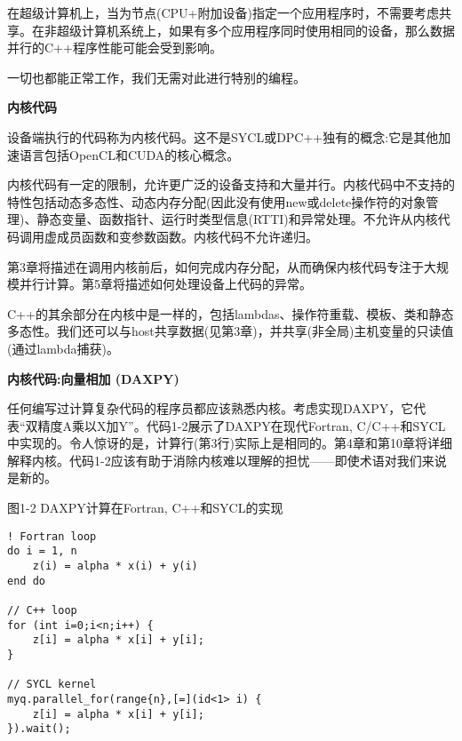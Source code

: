 在超级计算机上，当为节点(CPU+附加设备)指定一个应用程序时，不需要考虑共享。在非超级计算机系统上，如果有多个应用程序同时使用相同的设备，那么数据并行的C++程序性能可能会受到影响。\par

一切也都能正常工作，我们无需对此进行特别的编程。\par

\hspace*{\fill} \par %
\textbf{内核代码}

设备端执行的代码称为内核代码。这不是SYCL或DPC++独有的概念:它是其他加速语言包括OpenCL和CUDA的核心概念。\par

内核代码有一定的限制，允许更广泛的设备支持和大量并行。内核代码中不支持的特性包括动态多态性、动态内存分配(因此没有使用new或delete操作符的对象管理)、静态变量、函数指针、运行时类型信息(RTTI)和异常处理。不允许从内核代码调用虚成员函数和变参数函数。内核代码不允许递归。\par

第3章将描述在调用内核前后，如何完成内存分配，从而确保内核代码专注于大规模并行计算。第5章将描述如何处理设备上代码的异常。\par

C++的其余部分在内核中是一样的，包括lambdas、操作符重载、模板、类和静态多态性。我们还可以与host共享数据(见第3章)，并共享(非全局)主机变量的只读值(通过lambda捕获)。\par

\hspace*{\fill} \par %
\textbf{内核代码:向量相加 (DAXPY)}

任何编写过计算复杂代码的程序员都应该熟悉内核。考虑实现DAXPY，它代表“双精度A乘以X加Y”。代码1-2展示了DAXPY在现代Fortran, C/C++和SYCL中实现的。令人惊讶的是，计算行(第3行)实际上是相同的。第4章和第10章将详细解释内核。代码1-2应该有助于消除内核难以理解的担忧——即使术语对我们来说是新的。\par

图1-2 DAXPY计算在Fortran, C++和SYCL的实现
\begin{lstlisting}[caption={}]
! Fortran loop
do i = 1, n
	z(i) = alpha * x(i) + y(i)
end do

// C++ loop
for (int i=0;i<n;i++) {
	z[i] = alpha * x[i] + y[i];
}

// SYCL kernel
myq.parallel_for(range{n},[=](id<1> i) {
	z[i] = alpha * x[i] + y[i];
}).wait();
\end{lstlisting}

